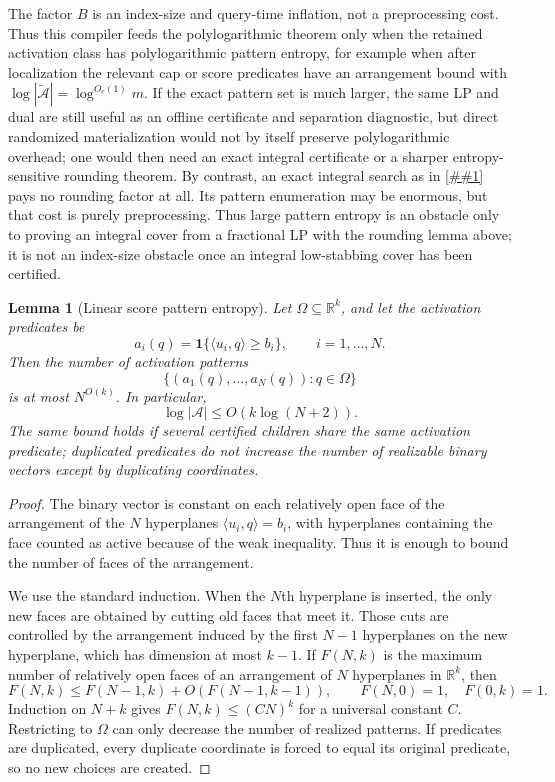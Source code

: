 \documentclass[10pt]{article}
\newcommand{\cref}[1]{\ref{##1}}
\newtheorem{lemma}[theorem]{Lemma}
\theoremstyle{definition}
\newcommand{\R}{\mathbb{R}}
\begin{document}
The factor $B$ is an index-size and query-time inflation, not a preprocessing
cost.  Thus this compiler feeds the polylogarithmic theorem only when the
retained activation class has polylogarithmic pattern entropy, for example when
after localization the relevant cap or score predicates have an arrangement
bound with $\log|\widetilde{\mathcal A}|=\log^{O_c(1)}m$.  If the exact pattern
set is much larger, the same LP and dual are still useful as an offline
certificate and separation diagnostic, but direct randomized materialization
would not by itself preserve polylogarithmic overhead; one would then need an
exact integral certificate or a sharper entropy-sensitive rounding theorem.
By contrast, an exact integral search as in
\cref{cor:offline-pareto-compression} pays no rounding factor at all.  Its
pattern enumeration may be enormous, but that cost is purely preprocessing.
Thus large pattern entropy is an obstacle only to proving an integral cover from
a fractional LP with the rounding lemma above; it is not an index-size obstacle
once an integral low-stabbing cover has been certified.

\begin{lemma}[Linear score pattern entropy]\label{lem:linear-pattern-entropy}
   Let $\Omega\subseteq\R^k$, and let the activation predicates be
   \[
      a_i(q)=\mathbf 1\{\langle u_i,q\rangle\ge b_i\},
      \qquad i=1,\ldots,N .
   \]
   Then the number of activation patterns
   \[
      \{(a_1(q),\ldots,a_N(q)):q\in\Omega\}
   \]
   is at most $N^{O(k)}$.  In particular,
   \[
      \log|\mathcal A|\le O(k\log(N+2)).
   \]
   The same bound holds if several certified children share the same
   activation predicate; duplicated predicates do not increase the number of
   realizable binary vectors except by duplicating coordinates.
\end{lemma}

\begin{proof}
   The binary vector is constant on each relatively open face of the
   arrangement of the $N$ hyperplanes
   $\langle u_i,q\rangle=b_i$, with hyperplanes containing the face counted as
   active because of the weak inequality.  Thus it is enough to bound the number
   of faces of the arrangement.

   We use the standard induction.  When the $N$th hyperplane is inserted, the
   only new faces are obtained by cutting old faces that meet it.  Those cuts
   are controlled by the arrangement induced by the first $N-1$ hyperplanes on
   the new hyperplane, which has dimension at most $k-1$.  If $F(N,k)$ is the
   maximum number of relatively open faces of an arrangement of $N$ hyperplanes
   in $\R^k$, then
   \[
      F(N,k)\le F(N-1,k)+O(F(N-1,k-1)),
      \qquad
      F(N,0)=1,\quad F(0,k)=1 .
   \]
   Induction on $N+k$ gives $F(N,k)\le (CN)^k$ for a universal constant $C$.
   Restricting to $\Omega$ can only decrease the number of realized patterns.
   If predicates are duplicated, every duplicate coordinate is forced to equal
   its original predicate, so no new choices are created.
\end{proof}
\end{document}
